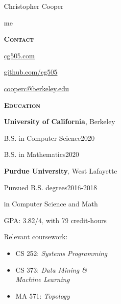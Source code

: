 \documentclass[11pt]{article}
\newcommand{\sectionfont}{\Large\scshape\bfseries\color{cg505green}}
\begin{document}
\begin{centering}
  \fontsize{50pt}{50pt}\selectfont
  \color{cg505green}
  Christopher Cooper

\end{centering}

\vspace{25pt}

\begin{minipage}[t]{0.3\textwidth}
  {\Huge\color{black} me \phantom{my work}}

  \vspace{5pt}

  {\sectionfont Contact}
  \begin{adjustwidth}{10pt}{}
    \href{https://cg505.com/}{cg505.com}

    \href{https://github.com/cg505/}{github.com/cg505}

    \href{mailto:cooperc@berkeley.edu}{cooperc@berkeley.edu}
  \end{adjustwidth}

  \vspace{5pt}

  {\sectionfont Education}

  \textbf{University of California}, Berkeley
  \begin{adjustwidth}{10pt}{}
    B.S. in Computer Science\hfill2020

    B.S. in Mathematics\hfill2020
  \end{adjustwidth}

  \textbf{Purdue University}, West Lafayette
  \begin{adjustwidth}{10pt}{}
    Pursued B.S. degrees\hfill2016-2018

    \enskip in Computer Science and Math

    GPA: 3.82/4, with 79 credit-hours

    Relevant coursework:
    \begin{itemize}[leftmargin=*]
    \item CS 252: \emph{Systems Programming}
    \item CS 373: \emph{Data Mining \&}\\\phantom{CS 373:} \emph{Machine Learning}
    \item MA 571: \emph{Topology}
    \end{itemize}
  \end{adjustwidth}

  \vspace{5pt}


\end{minipage}
\end{document}
